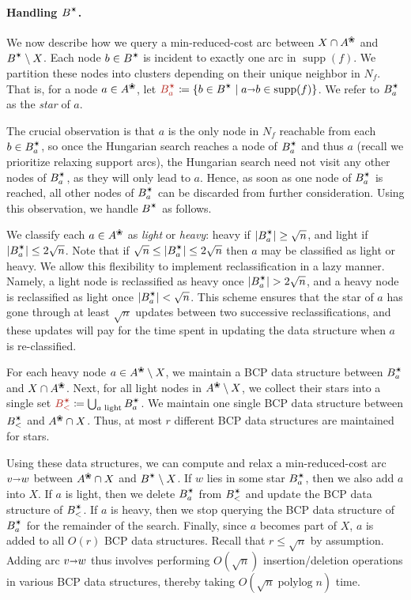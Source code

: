 \documentclass[11pt]{article}
\def\polylog{\mathop{\mathrm{polylog}}}
\def\abs#1{\mathopen| #1 \mathclose|}		%
\def\arcto{\mathord\shortrightarrow}
\def\arc#1#2{#1\arcto#2}
\def\supp{\operatorname{supp}}
\def\alive#1{{#1}^\text{\ding{96}}}
\def\star{\text{\ding{84}}}
\numberwithin{figure}{section}
\def\EMPH#1{\textcolor{BrickRed}{{\emph{#1}}}}
\begin{document}
\paragraph*{Handling $B^\star$.}
We now describe how we query a min-reduced-cost arc between $X \cap \alive{A}$
and $B^\star \setminus X$.
Each node $b \in B^\star$ is incident to exactly one arc in
$\supp(f)$.
We partition these nodes into clusters depending on their unique neighbor in $N_f$.
That is, for a node $a \in \alive{A}$,
let $\EMPH{$B_a^\star$} \coloneqq \{b \in B^\star \mid {\arc ab} \in \supp(f)\}$.
We refer to $B_a^\star$ as the \EMPH{star} of $a$.

The crucial observation is that $a$ is the only node in $N_f$ reachable from
each $b \in B_a^\star$, so once the Hungarian search reaches a node of $B_a^\star$ and thus
$a$ (recall we prioritize relaxing support arcs), the Hungarian search need
not visit any other nodes of $B_a^\star$, as they will only lead to $a$.
Hence, as soon as one node of $B_a^\star$ is reached, all other nodes of $B_a^\star$ can be
discarded from further consideration.
Using this observation, we handle $B^\star$ as follows.

We classify each $a \in \alive{A}$ as \EMPH{light} or \EMPH{heavy}:
heavy if $\abs{B_a^\star} \geq \sqrt{n}$,
and light if $\abs{B_a^\star} \leq 2\sqrt{n}$.
Note that if $\sqrt{n} \leq \abs{B_a^\star} \leq 2\sqrt{n}$ then $a$ may be classified
as light or heavy.
We allow this flexibility to implement reclassification in a lazy manner.
Namely, a light node is reclassified as heavy once $\abs{B_a^\star} > 2\sqrt{n}$,
and a heavy node is reclassified as light once $\abs{B_a^\star} < \sqrt{n}$.
This scheme ensures that the star of $a$ has gone through at least $\sqrt{n}$
updates between two successive reclassifications,
and these updates will pay for the time spent in updating the data structure
when $a$ is re-classified.

For each heavy node $a \in \alive{A} \setminus X$, we maintain a BCP data
structure between $B_a^\star$ and $X \cap \alive{A}$.
Next, for all light nodes in $\alive{A} \setminus X$, we collect their stars into
a single set $\EMPH{$B_<^\star$} \coloneqq \bigcup_{\text{$a$ light}} B_a^\star$.
We maintain one single BCP data structure between $B_<^\star$ and $\alive{A} \cap X$.
Thus, at most $r$ different BCP data structures are maintained for stars.

Using these data structures, we can compute and relax a min-reduced-cost arc $\arc vw$ between
$\alive{A} \cap X$ and $B^\star \setminus X$.
If $w$ lies in some star $B_a^\star$, then we also add $a$ into $X$.
If $a$ is light, then we delete $B_a^\star$ from $B_<^\star$ and update the BCP data structure of $B_<^\star$.
If $a$ is heavy, then we stop querying the BCP data structure of $B_a^\star$ for the
remainder of the search.
Finally, since $a$ becomes part of $X$, $a$ is added to all $O(r)$ BCP data structures.
%
Recall that $r \leq \sqrt{n}$ by assumption.
Adding arc $\arc vw$ thus involves performing $O(\sqrt{n})$
insertion/deletion operations in various BCP data structures, thereby taking
$O(\sqrt{n}\polylog n)$ time.
\end{document}
